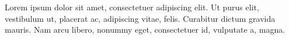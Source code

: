 {\rmfamily
Lorem ipsum dolor sit amet, consectetuer adipiscing elit. Ut purus elit,
vestibulum ut, placerat ac, adipiscing vitae, felis. Curabitur dictum gravida
mauris. Nam arcu libero, nonummy eget, consectetuer id, vulputate a, magna.}
